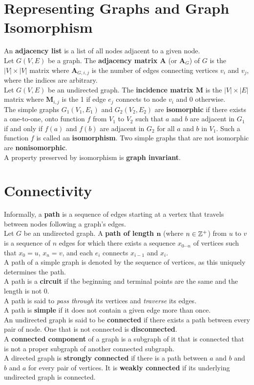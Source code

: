 \documentclass[./Discrete Math.tex]{subfiles}
\begin{document}
	\section{Representing Graphs and Graph Isomorphism}
		An \textbf{adjacency list} is a list of all nodes adjacent to a given node. \\
		Let \(G(V, E)\) be a graph. The \textbf{adjacency matrix A} (or \(\textbf{A}_G\)) of \(G\) is the \(|V| \times |V|\) matrix where \(\textbf{A}_{G, i, j}\) is the number of edges connecting vertices \(v_i\) and \(v_j\), where the indices are arbitrary. \\
		Let \(G(V, E)\) be an undirected graph. The \textbf{incidence matrix \(\textbf{M}\)} is the \(|V| \times |E|\) matrix where \(\textbf{M}_{i, j}\) is the 1 if edge \(e_j\) connects to node \(v_i\) and 0 otherwise. \\
		The simple graphs \(G_1(V_1, E_1)\) and \(G_2(V_2, E_2)\) are \textbf{isomorphic} if there exists a one-to-one, onto function \(f\) from \(V_1\) to \(V_2\) such that \(a\) and \(b\) are adjacent in \(G_1\) if and only if \(f(a)\) and \(f(b)\) are adjacent in \(G_2\) for all \(a\) and \(b\) in \(V_1\). Such a function \(f\) is called an \textbf{isomorphism}. Two simple graphs that are not isomorphic are \textbf{nonisomorphic}. \\
		A property preserved by isomorphism is \textbf{graph invariant}.
	\section{Connectivity}
		Informally, a \textbf{path} is a sequence of edges starting at a vertex that travels between nodes following a graph's edges. \\
		Let \(G\) be an undirected graph. A \textbf{path of length \(\bm{n}\)} (where \(n \in \mathbb{Z}^+\)) from \(u\) to \(v\) is a sequence of \(n\) edges for which there exists a sequence \(x_{0 \cdots n}\) of vertices such that \(x_0 = u\),  \(x_n = v\), and each \(e_i\) connects \(x_{i - 1}\) and \(x_i\). \\
		A path of a simple graph is denoted by the sequence of vertices, as this uniquely determines the path. \\
		A path is a \textbf{circuit} if the beginning and terminal points are the same and the length is not 0. \\
		A path is said to \textit{pass through} its vertices and \textit{traverse} its edges. \\
		A path is \textbf{simple} if it does not contain a given edge more than once. \\
		An undirected graph is said to be \textbf{connected} if there exists a path between every pair of node. One that is not connected is \textbf{disconnected}. \\
		A \textbf{connected component} of a graph is a subgraph of it that is connected that is not a proper subgraph of another connected subgraph. \\
		A directed graph is \textbf{strongly connected} if there is a path between \(a\) and \(b\) and \(b\) and \(a\) for every pair of vertices. It is \textbf{weakly connected} if its underlying undirected graph is connected.
\end{document}
